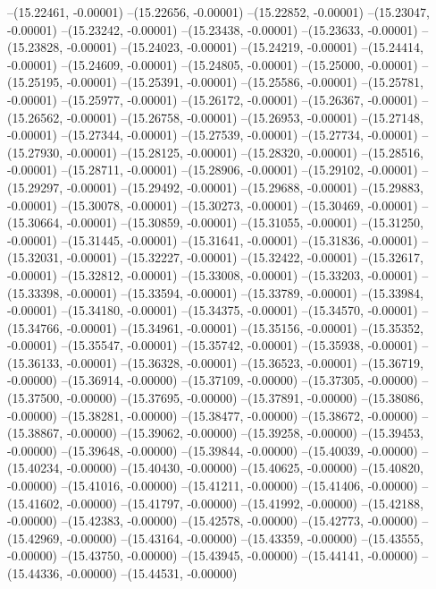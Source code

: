 --(15.22461, -0.00001)
--(15.22656, -0.00001)
--(15.22852, -0.00001)
--(15.23047, -0.00001)
--(15.23242, -0.00001)
--(15.23438, -0.00001)
--(15.23633, -0.00001)
--(15.23828, -0.00001)
--(15.24023, -0.00001)
--(15.24219, -0.00001)
--(15.24414, -0.00001)
--(15.24609, -0.00001)
--(15.24805, -0.00001)
--(15.25000, -0.00001)
--(15.25195, -0.00001)
--(15.25391, -0.00001)
--(15.25586, -0.00001)
--(15.25781, -0.00001)
--(15.25977, -0.00001)
--(15.26172, -0.00001)
--(15.26367, -0.00001)
--(15.26562, -0.00001)
--(15.26758, -0.00001)
--(15.26953, -0.00001)
--(15.27148, -0.00001)
--(15.27344, -0.00001)
--(15.27539, -0.00001)
--(15.27734, -0.00001)
--(15.27930, -0.00001)
--(15.28125, -0.00001)
--(15.28320, -0.00001)
--(15.28516, -0.00001)
--(15.28711, -0.00001)
--(15.28906, -0.00001)
--(15.29102, -0.00001)
--(15.29297, -0.00001)
--(15.29492, -0.00001)
--(15.29688, -0.00001)
--(15.29883, -0.00001)
--(15.30078, -0.00001)
--(15.30273, -0.00001)
--(15.30469, -0.00001)
--(15.30664, -0.00001)
--(15.30859, -0.00001)
--(15.31055, -0.00001)
--(15.31250, -0.00001)
--(15.31445, -0.00001)
--(15.31641, -0.00001)
--(15.31836, -0.00001)
--(15.32031, -0.00001)
--(15.32227, -0.00001)
--(15.32422, -0.00001)
--(15.32617, -0.00001)
--(15.32812, -0.00001)
--(15.33008, -0.00001)
--(15.33203, -0.00001)
--(15.33398, -0.00001)
--(15.33594, -0.00001)
--(15.33789, -0.00001)
--(15.33984, -0.00001)
--(15.34180, -0.00001)
--(15.34375, -0.00001)
--(15.34570, -0.00001)
--(15.34766, -0.00001)
--(15.34961, -0.00001)
--(15.35156, -0.00001)
--(15.35352, -0.00001)
--(15.35547, -0.00001)
--(15.35742, -0.00001)
--(15.35938, -0.00001)
--(15.36133, -0.00001)
--(15.36328, -0.00001)
--(15.36523, -0.00001)
--(15.36719, -0.00000)
--(15.36914, -0.00000)
--(15.37109, -0.00000)
--(15.37305, -0.00000)
--(15.37500, -0.00000)
--(15.37695, -0.00000)
--(15.37891, -0.00000)
--(15.38086, -0.00000)
--(15.38281, -0.00000)
--(15.38477, -0.00000)
--(15.38672, -0.00000)
--(15.38867, -0.00000)
--(15.39062, -0.00000)
--(15.39258, -0.00000)
--(15.39453, -0.00000)
--(15.39648, -0.00000)
--(15.39844, -0.00000)
--(15.40039, -0.00000)
--(15.40234, -0.00000)
--(15.40430, -0.00000)
--(15.40625, -0.00000)
--(15.40820, -0.00000)
--(15.41016, -0.00000)
--(15.41211, -0.00000)
--(15.41406, -0.00000)
--(15.41602, -0.00000)
--(15.41797, -0.00000)
--(15.41992, -0.00000)
--(15.42188, -0.00000)
--(15.42383, -0.00000)
--(15.42578, -0.00000)
--(15.42773, -0.00000)
--(15.42969, -0.00000)
--(15.43164, -0.00000)
--(15.43359, -0.00000)
--(15.43555, -0.00000)
--(15.43750, -0.00000)
--(15.43945, -0.00000)
--(15.44141, -0.00000)
--(15.44336, -0.00000)
--(15.44531, -0.00000)
